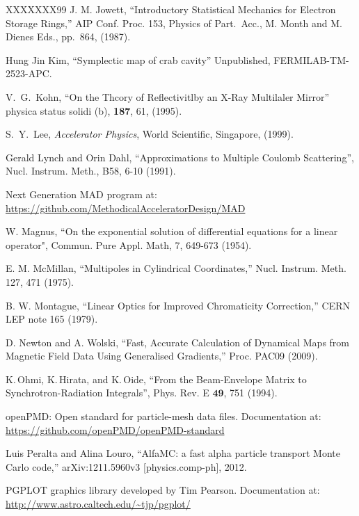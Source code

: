 \begin{thebibliography}{XXXXXXX99}
J. M. Jowett, 
``Introductory Statistical Mechanics for Electron Storage Rings,'' 
AIP Conf. Proc. 153, Physics of Part.\ Acc.,
M. Month and M. Dienes Eds., pp.~864, (1987).

Hung Jin Kim,
``Symplectic map of crab cavity''
Unpublished, FERMILAB-TM-2523-APC.

V.~G.~Kohn, 
``On the Thcory of Reflectivitlby an X-Ray Multilaler Mirror''
physica status solidi (b), {\bf 187}, 61, (1995).

S.~Y.~Lee,
{\it Accelerator Physics},
World Scientific, Singapore, (1999).

Gerald Lynch and Orin Dahl,
``Approximations to Multiple Coulomb Scattering'',
Nucl. Instrum. Meth., B58, 6-10 (1991).

Next Generation MAD program at:
\hfill\break
\hspace*{0.3in}
\url{https://github.com/MethodicalAcceleratorDesign/MAD}

W. Magnus,
``On the exponential solution of differential equations for a linear operator",
Commun. Pure Appl. Math, 7, 649-673 (1954).

E. M. McMillan, 
``Multipoles in Cylindrical Coordinates,''
Nucl. Instrum. Meth. 127, 471 (1975).

B. W. Montague, 
``Linear Optics for Improved Chromaticity Correction,''
CERN LEP note 165 (1979).

D. Newton and A. Wolski, 
``Fast, Accurate Calculation of Dynamical Maps from
Magnetic Field Data Using Generalised Gradients,''
Proc. PAC09 (2009).

K.\,Ohmi, K.\,Hirata, and K.\,Oide,
``From the Beam-Envelope Matrix to Synchrotron-Radiation Integrals'',
Phys. Rev. E $\mathbf{49}$, 751 (1994).

openPMD: Open standard for particle-mesh data files. Documentation at:
\hfill\break
\hspace*{0.3in}
\url{https://github.com/openPMD/openPMD-standard}

Luis Peralta and Alina Louro, 
``AlfaMC: a fast alpha particle transport Monte Carlo code,''
 arXiv:1211.5960v3 [physics.comp-ph], 2012.

PGPLOT graphics library developed by Tim Pearson. Documentation at:
\hfill\break
\hspace*{0.3in}
\url{http://www.astro.caltech.edu/~tjp/pgplot/}


\end{thebibliography}
